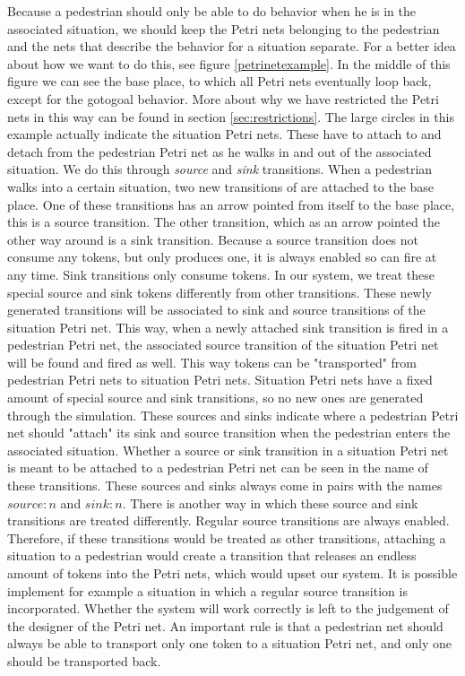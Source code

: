 \documentclass[11pt]{book}
\begin{document}
Because a pedestrian should only be able to do behavior when he is in the associated situation, we should keep the Petri nets belonging to the pedestrian and the nets that describe the behavior for a situation separate. For a better idea about how we want to do this, see figure \ref{petrinetexample}. In the middle of this figure we can see the base place, to which all Petri nets eventually loop back, except for the gotogoal behavior. More about why we have restricted the Petri nets in this way can be found in section \ref{sec:restrictions}. The large circles in this example actually indicate the situation Petri nets. These have to attach to and detach from the pedestrian Petri net as he walks in and out of the associated situation. We do this through \emph{source} and \emph{sink} transitions. When a pedestrian walks into a certain situation, two new transitions of are attached to the base place. One of these transitions has an arrow pointed from itself to the base place, this is a source transition. The other transition, which as an arrow pointed the other way around is a sink transition. Because a source transition does not consume any tokens, but only produces one, it is always enabled so can fire at any time. Sink transitions only consume tokens. In our system, we treat these special source and sink tokens differently from other transitions. These newly generated transitions will be associated to sink and source transitions of the situation Petri net. This way, when a newly attached sink transition is fired in a pedestrian Petri net, the associated source transition of the situation Petri net will be found and fired as well. This way tokens can be "transported" from pedestrian Petri nets to situation Petri nets. Situation Petri nets have a fixed amount of special source and sink transitions, so no new ones are generated through the simulation. These sources and sinks indicate where a pedestrian Petri net should "attach" its sink and source transition when the pedestrian enters the associated situation. Whether a source or sink transition in a situation Petri net is meant to be attached to a pedestrian Petri net can be seen in the name of these transitions. These sources and sinks always come in pairs with the names $source:n$ and $sink:n$.
There is another way in which these source and sink transitions are treated differently. Regular source transitions are always enabled. Therefore, if these transitions would be treated as other transitions, attaching a situation to a pedestrian would create a transition that releases an endless amount of tokens into the Petri nets, which would upset our system. It is possible implement for example a situation in which a regular source transition is incorporated. Whether the system will work correctly is left to the judgement of the designer of the Petri net. An important rule is that a pedestrian net should always be able to transport only one token to a situation Petri net, and only one should be transported back.
\end{document}
